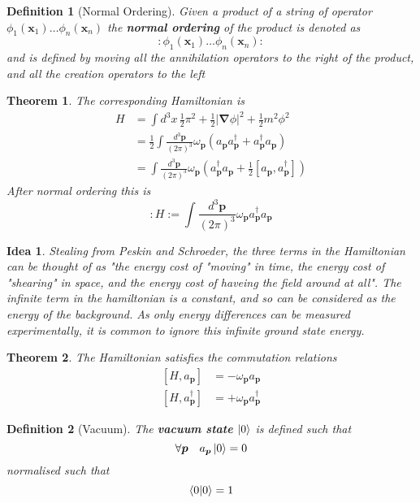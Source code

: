 \documentclass{article}
\newtheorem{theorem}{Theorem}[subsection]
\newtheorem{definition}{Definition}[subsection]
\newtheorem*{idea}{Idea}
\newcommand{\grad}{\bm{\nabla}}
\newcommand{\tmeas}{\frac{d^3\bm{p}}{(2\pi)^3}}
\newcommand{\bam}[1]{\textbf{#1}}
\newcommand{\comm}[2][]{\left[ #1, #2 \right]} %
\begin{document}
\begin{definition}[Normal Ordering]
Given a product of a string of operator $\phi_1(\bm{x}_1)\dots\phi_n(\bm{x}_n)$ the \bam{normal ordering} of the product is denoted as 
\[
:\phi_1(\bm{x}_1)\dots\phi_n(\bm{x}_n):
\]
and is defined by moving all the annihilation operators to the right of the product, and all the creation operators to the left 
\end{definition}

\begin{theorem}
The corresponding Hamiltonian is 
\begin{align*}
    H &= \int d^3x \, \frac{1}{2}\pi^2+\frac{1}{2}|\grad\phi|^2+\frac{1}{2}m^2\phi^2 \\
    &= \frac{1}{2} \int \tmeas \omega_{\bm{p}} (a_{\bm{p}}a_{\bm{p}}^\dagger+a_{\bm{p}}^\dagger a_{\bm{p}}) \\
    &= \int \tmeas \omega_{\bm{p}} ( a_{\bm{p}}^\dagger a_{\bm{p}} +\frac{1}{2}\comm[a_{\bm{p}}]{a_{\bm{p}}^\dagger})
\end{align*}
After normal ordering this is 
\[
:H:=\int\tmeas \omega_{\bm{p}} a_{\bm{p}}^\dagger a_{\bm{p}}
\]
\end{theorem}

\begin{idea}
Stealing from Peskin and Schroeder, the three terms in the Hamiltonian can be thought of as "the energy cost of "moving" in time, the energy cost of "shearing" in space, and the energy cost of haveing the field around at all". The infinite term in the hamiltonian is a constant, and so can be considered as the energy of the background. As only energy differences can be measured experimentally, it is common to ignore this infinite ground state energy. 
\end{idea}

\begin{theorem}
The Hamiltonian satisfies the commutation relations
\begin{align*}
    \comm[H]{a_{\bm{p}}} &= -\omega_{\bm{p}} a_{\bm{p}} \\ 
    \comm[H]{a_{\bm{p}}^\dagger} &= +\omega_{\bm{p}} a_{\bm{p}}^\dagger
\end{align*}
\end{theorem}

\begin{definition}[Vacuum]
The \bam{vacuum state} $\ket{0}$ is defined such that 
\[
\forall \bm{p} \quad a_{\bm{p}} \ket{0} = 0
\]
normalised such that 
\[
\braket{0|0}=1
\]
\end{definition}
\end{document}
